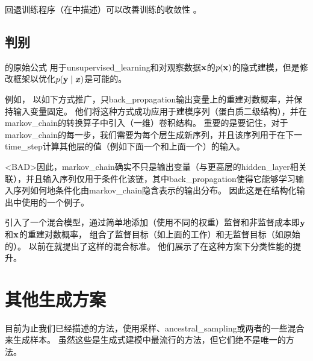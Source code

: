 回退训练程序（在中描述）可以改善训练的收敛性\citep{Bengio-et-al-ICML-2014} 。


\subsection{判别}
\label{sec:discriminant_gsns}
的原始公式\citep{Bengio-et-al-ICML-2014} 用于\gls{unsupervised_learning}和对观察数据$\mathbf{x}$的$p(\mathbf{x})$的隐式建模，但是修改框架以优化$p(\mathbf{y}  \mid  \boldsymbol{\mathit{x}})$是可能的。


例如， \citet{Zhou+Troyanskaya-ICML2014} 以如下方式推广，只\gls{back_propagation}输出变量上的重建对数概率，并保持输入变量固定。
他们将这种方式成功应用于建模序列（蛋白质二级结构），并在\gls{markov_chain}的转换算子中引入（一维）卷积结构。
重要的是要记住，对于\gls{markov_chain}的每一步，我们需要为每个层生成新序列，并且该序列用于在下一\gls{time_step}计算其他层的值（例如下面一个和上面一个）的输入。

<BAD>因此，\gls{markov_chain}确实不只是输出变量（与更高层的\gls{hidden_layer}相关联），并且输入序列仅用于条件化该链，其中\gls{back_propagation}使得它能够学习输入序列如何地条件化由\gls{markov_chain}隐含表示的输出分布。
因此这是在结构化输出中使用的一个例子。

\citet{Zohrer+Pernkopf-NIPS2014-small} 引入了一个混合模型，通过简单地添加（使用不同的权重）监督和非监督成本即$\mathbf{y}$和$\mathbf{x}$的重建对数概率， 组合了监督目标（如上面的工作）和无监督目标（如原始的）。
\citet{Larochelle+Bengio-2008-small}以前在就提出了这样的混合标准。
他们展示了在这种方案下分类性能的提升。


\section{其他生成方案}
\label{sec:other_generation_schemes}
目前为止我们已经描述的方法，使用采样、\gls{ancestral_sampling}或两者的一些混合来生成样本。
虽然这些是生成式建模中最流行的方法，但它们绝不是唯一的方法。


